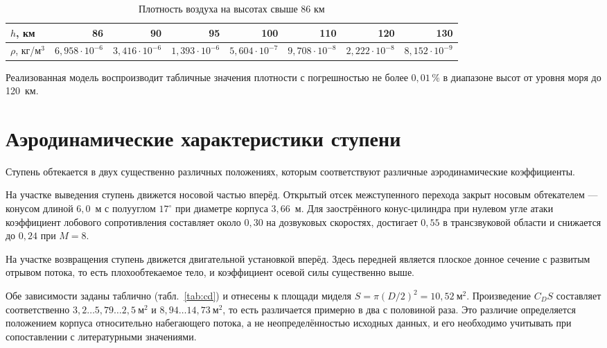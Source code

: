 \documentclass[11pt,a4paper]{article}
\begin{document}
\begin{table}[htb]
\centering
\caption{Плотность воздуха на высотах свыше 86 км}
\label{tab:atm2}
\begin{tabular}{lrrrrrrr}
\toprule
$h$, км & 86 & 90 & 95 & 100 & 110 & 120 & 130 \\
\midrule
$\rho$, кг/м$^3$ & $6{,}958{\cdot}10^{-6}$ & $3{,}416{\cdot}10^{-6}$ &
$1{,}393{\cdot}10^{-6}$ & $5{,}604{\cdot}10^{-7}$ & $9{,}708{\cdot}10^{-8}$ &
$2{,}222{\cdot}10^{-8}$ & $8{,}152{\cdot}10^{-9}$ \\
\bottomrule
\end{tabular}
\end{table}

Реализованная модель воспроизводит табличные значения плотности с погрешностью
не более $0{,}01\,\%$ в диапазоне высот от уровня моря до 120~км.

\section{Аэродинамические характеристики ступени}
\label{sec:aero}

Ступень обтекается в двух существенно различных положениях, которым
соответствуют различные аэродинамические коэффициенты.

На участке выведения ступень движется носовой частью вперёд. Открытый отсек
межступенного перехода закрыт носовым обтекателем — конусом длиной $6{,}0$~м с
полууглом $17^\circ$ при диаметре корпуса $3{,}66$~м. Для заострённого
конус-цилиндра при нулевом угле атаки коэффициент лобового сопротивления
составляет около $0{,}30$ на дозвуковых скоростях, достигает $0{,}55$ в
трансзвуковой области и снижается до $0{,}24$ при $M=8$.

На участке возвращения ступень движется двигательной установкой вперёд. Здесь
передней является плоское донное сечение с развитым отрывом потока, то есть
плохообтекаемое тело, и коэффициент осевой силы существенно выше.

Обе зависимости заданы таблично (табл.~\ref{tab:cd}) и отнесены к площади миделя
$S=\pi(D/2)^2=10{,}52\ \text{м}^2$. Произведение $C_D S$ составляет
соответственно $3{,}2\ldots5{,}79\ldots2{,}5\ \text{м}^2$ и
$8{,}94\ldots14{,}73\ \text{м}^2$, то есть различается примерно в два с половиной
раза. Это различие определяется положением корпуса относительно набегающего
потока, а не неопределённостью исходных данных, и его необходимо учитывать при
сопоставлении с литературными значениями.
\end{document}
